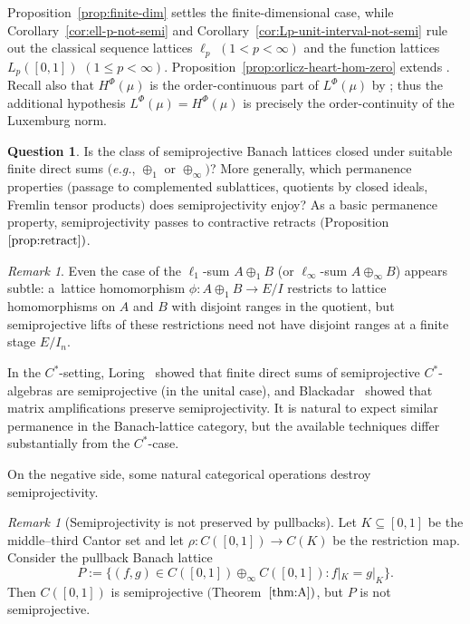 \documentclass[11pt]{amsart}
\renewcommand{\le}{\leqslant}
\numberwithin{equation}{section}
\theoremstyle{definition}
\newtheorem{question}[theorem]{Question}
\theoremstyle{remark}
\newtheorem{remark}[theorem]{Remark}
\theoremstyle{plain}
\begin{document}
Proposition~\ref{prop:finite-dim} settles the finite-dimensional case,
while Corollary~\ref{cor:ell-p-not-semi} and
Corollary~\ref{cor:Lp-unit-interval-not-semi}
rule out the classical sequence lattices \(\ell_p\) \((1<p<\infty)\) and the function lattices
\(L_p([0,1])\) \((1\le p<\infty)\).
Proposition~\ref{prop:orlicz-heart-hom-zero} extends
\cite[Example~3.3(iii)]{dantas2022}. Recall also that \(H^\Phi(\mu)\) is the
order-continuous part of \(L^\Phi(\mu)\) by
\cite[Proposition~4.7]{gao-leung-xanthos};
thus the additional hypothesis \(L^\Phi(\mu)=H^\Phi(\mu)\) is precisely the
order-continuity of the Luxemburg norm.

\begin{question}\label{q:permanence}
Is the class of semiprojective Banach lattices closed under
suitable finite direct sums $($\emph{e.g.}, $\oplus_1$ or $\oplus_\infty$$)$?
More generally, which permanence properties
$($passage to complemented sublattices, quotients by closed ideals,
Fremlin tensor products$)$ does semiprojectivity enjoy?
As a basic permanence property, semiprojectivity passes to contractive retracts
$($Proposition~$\ref{prop:retract})$.
\end{question}

\begin{remark}
Even the case of the $\ell_1$-sum $A\oplus_1 B$ (or $\ell_\infty$-sum $A\oplus_\infty B$)
appears subtle:
a~lattice homomorphism $\phi\colon A\oplus_1 B\to E/I$ restricts to lattice homomorphisms
on $A$ and $B$ with disjoint ranges in the quotient, but semiprojective lifts of these restrictions
need not have disjoint ranges at a finite stage $E/I_n$.
\end{remark}

In the $C^*$-setting, Loring~\cite{loring} showed that finite direct sums of semiprojective
$C^*$-algebras are semiprojective (in the unital case),
and Blackadar~\cite{blackadar-survey} showed that matrix amplifications
preserve semiprojectivity.
It is natural to expect similar permanence in the Banach-lattice category,
but the available techniques differ substantially from the $C^*$-case.

On the negative side, some natural categorical operations destroy semiprojectivity.

\begin{remark}[Semiprojectivity is not preserved by pullbacks]\label{rem:pullback}
Let $K\subseteq[0,1]$ be the middle--third Cantor set and let
$\rho\colon C([0,1])\to C(K)$ be the restriction map.
Consider the pullback Banach lattice
\[
P:=\{(f,g)\in C([0,1])\oplus_\infty C([0,1]) : f|_K=g|_K\}.
\]
Then $C([0,1])$ is semiprojective $($Theorem~$\ref{thm:A})$, but $P$ is not semiprojective.
\end{remark}
\end{document}
